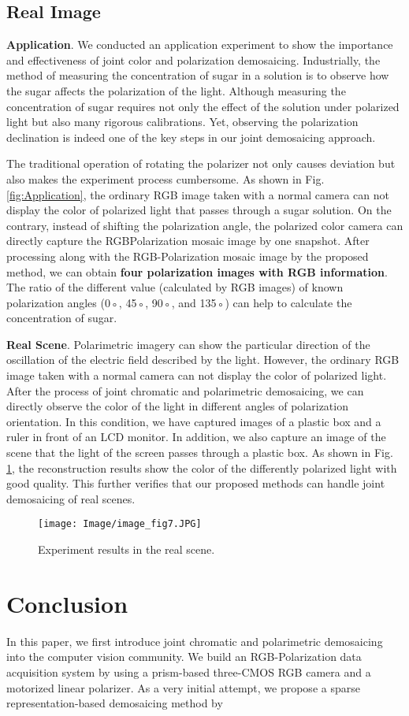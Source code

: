 \documentclass[10pt,twocolumn,letterpaper]{article}
\begin{document}
\subsection{Real Image}
\textbf{Application}. We conducted an application experiment to show the importance and effectiveness of joint color and
polarization demosaicing. Industrially, the method of measuring the concentration of sugar in a solution is to observe how the sugar affects the polarization of the light. Although measuring the concentration of sugar requires not only the
effect of the solution under polarized light but also many rigorous calibrations. Yet, observing the polarization declination is indeed one of the key steps in our joint demosaicing approach.

The traditional operation of rotating the polarizer not only causes deviation but also makes the experiment process
cumbersome. As shown in Fig. \ref{fig:Application}, the ordinary RGB image taken with a normal camera can not display the color of polarized light that passes through a sugar solution. On the contrary, instead of shifting the polarization angle, the polarized color camera can directly capture the RGBPolarization mosaic image by one snapshot. After processing along with the RGB-Polarization mosaic image by the proposed method, we can obtain \textbf{four polarization images with RGB information}. The ratio of the different value (calculated by RGB images) of known polarization angles (0◦, 45◦, 90◦, and 135◦) can help to calculate the concentration of sugar.

\textbf{Real Scene}. Polarimetric imagery can show the particular direction of the oscillation of the electric field described by the light. However, the ordinary RGB image taken with a normal camera can not display the color of polarized light. After the process of joint chromatic and polarimetric demosaicing, we can directly observe the color of the light in
different angles of polarization orientation. In this condition, we have captured images of a plastic box and a ruler in front of an LCD monitor. In addition, we also capture an image of the scene that the light of the screen passes through a plastic box. As shown in Fig. \ref{fig:7}, the reconstruction results show the color of the differently polarized light with good quality. This further verifies that our proposed methods can handle joint demosaicing of real scenes.

\begin{figure}
    \centering
    \texttt{[image: Image/image\_fig7.JPG]}
    \caption{Experiment results in the real scene.}
    \label{fig:7}
\end{figure}

\section{Conclusion}
In this paper, we first introduce joint chromatic and polarimetric demosaicing into the computer vision community. We build an RGB-Polarization data acquisition system by using a prism-based three-CMOS RGB camera and a motorized linear polarizer. As a very initial attempt, we propose a sparse representation-based demosaicing method by

{\small


}
\end{document}
